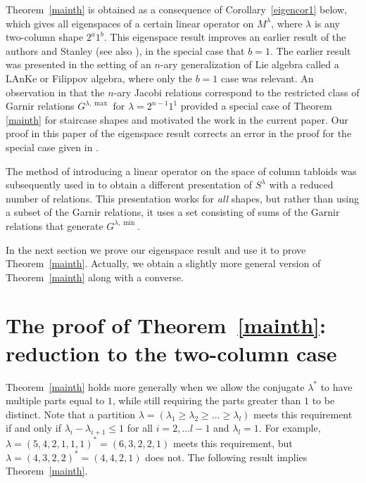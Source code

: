 \documentclass[12pt]{amsart}
\numberwithin{equation}{section}
\begin{document}
Theorem~\ref{mainth}  is obtained as a consequence of Corollary~\ref{eigencor1} below, which gives all eigenspaces of a certain linear operator on $M^{\lambda}$, where $\lambda$ is any two-column shape $ 2^a1^{b}$.  This eigenspace result improves   an earlier result of the authors and Stanley \cite{FHSW2} (see also \cite{FHSW1}), in the special case that $b=1$. The earlier result  was presented in the setting of an $n$-ary generalization of Lie algebra called a LAnKe or 
Filippov algebra, where only the $b=1$ case was relevant.  An observation in   \cite{FHSW2} that the $n$-ary Jacobi relations correspond to the restricted class of Garnir relations $G^{\lambda,\max}$  for  $\lambda=2^{n-1}1^{1}$  provided a special case of Theorem \ref{mainth} for staircase shapes and motivated the  work in the current paper. Our proof in this paper of the eigenspace result corrects an error in the proof for the special case given in \cite{FHSW2}.





The method of introducing a linear operator on the space of column tabloids was subsequently used in  \cite{BF}  to obtain a different presentation of $S^\lambda$ with a reduced number of relations. This presentation works for {\it all} 
shapes, but rather than using a subset of the Garnir relations,  it uses a set consisting of sums of  the Garnir relations that 
generate $G^{\lambda, \min}$.  

 

In the next section we prove  our eigenspace result and  use it to prove Theorem~\ref{mainth}.  Actually, we obtain a slightly more general version of  Theorem~\ref{mainth}  along with a converse.   






\section{The proof of Theorem~\ref{mainth}: reduction to the two-column case}

Theorem~\ref{mainth} holds more generally when we allow the conjugate $\lambda^*$ to have multiple parts equal to $1$, while still requiring the parts greater than $1$ to be distinct.   Note that a partition $\lambda=(\lambda_1\ge \lambda_2 \ge  \dots\ge  \lambda_l)$ meets this requirement if  and only if $\lambda_i -\lambda_{i+1} \le 1$ for all $i=2,\dots l-1$ and $\lambda_{l} =1$. For example,  $\lambda = (5,4,2,1,1,1)^*= (6,3,2,2,1)$ meets this requirement, but  $\lambda = (4,3,2,2)^*= (4,4,2,1)$ does not.  The following result implies Theorem~\ref{mainth}.  
\end{document}
